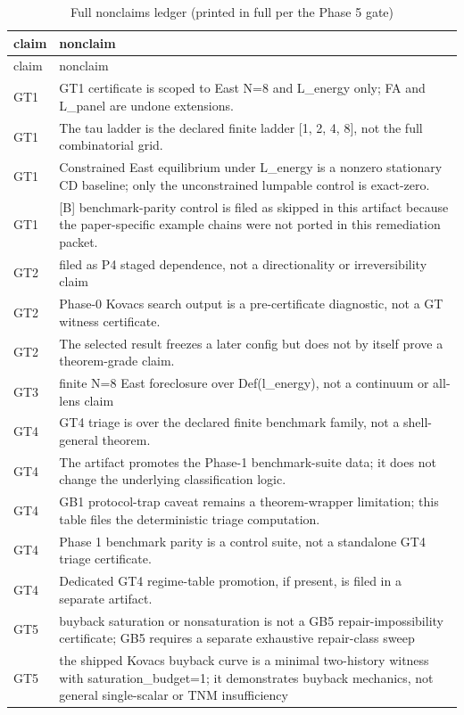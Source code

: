 \documentclass[11pt]{article}
\theoremstyle{definition}
\begin{document}
\begin{longtable}{lp{9cm}}
\caption{Full nonclaims ledger (printed in full per the Phase 5 gate)}\label{tab:nonclaims-full} \\
\toprule
claim & nonclaim \\
\midrule
\endfirsthead
\toprule
claim & nonclaim \\
\midrule
\endhead
\bottomrule
\endfoot
GT1 & GT1 certificate is scoped to East N=8 and L\_energy only; FA and L\_panel are undone extensions. \\
GT1 & The tau ladder is the declared finite ladder [1, 2, 4, 8], not the full combinatorial grid. \\
GT1 & Constrained East equilibrium under L\_energy is a nonzero stationary CD baseline; only the unconstrained lumpable control is exact-zero. \\
GT1 & [B] benchmark-parity control is filed as skipped in this artifact because the paper-specific example chains were not ported in this remediation packet. \\
GT2 & filed as P4 staged dependence, not a directionality or irreversibility claim \\
GT2 & Phase-0 Kovacs search output is a pre-certificate diagnostic, not a GT witness certificate. \\
GT2 & The selected result freezes a later config but does not by itself prove a theorem-grade claim. \\
GT3 & finite N=8 East foreclosure over Def(l\_energy), not a continuum or all-lens claim \\
GT4 & GT4 triage is over the declared finite benchmark family, not a shell-general theorem. \\
GT4 & The artifact promotes the Phase-1 benchmark-suite data; it does not change the underlying classification logic. \\
GT4 & GB1 protocol-trap caveat remains a theorem-wrapper limitation; this table files the deterministic triage computation. \\
GT4 & Phase 1 benchmark parity is a control suite, not a standalone GT4 triage certificate. \\
GT4 & Dedicated GT4 regime-table promotion, if present, is filed in a separate artifact. \\
GT5 & buyback saturation or nonsaturation is not a GB5 repair-impossibility certificate; GB5 requires a separate exhaustive repair-class sweep \\
GT5 & the shipped Kovacs buyback curve is a minimal two-history witness with saturation\_budget=1; it demonstrates buyback mechanics, not general single-scalar or TNM insufficiency \\

\end{longtable}
\end{document}
